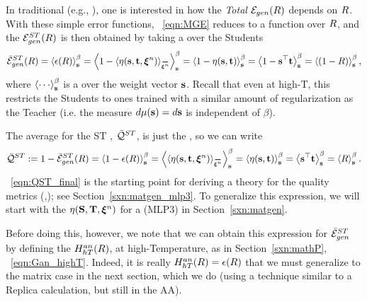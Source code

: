 In traditional \STATMECH (e.g., \cite{SST92}), one is interested in how the \emph{Total 
\GeneralizationError} ${\mathcal{E}}_{gen}(R)$ depends on $R$.
With these simple error functions, \EQN~\ref{eqn:MGE} reduces to a function over $R$,
and the \AverageSTGeneralizationError ${\mathcal{E}}^{ST}_{gen}(R)$ is then obtained by taking a \emph{\ThermalAverage} over the Students 
\begin{align}
\label{eqn:AVGSTGE_R}
\AVGSTGE(\AVGR)=\THRMAVG{\EPSL(\AVGR)}=
\THRMAVG{1-\langle\ETA(\SVEC,\TVEC,\NDXI)\rangle_{\AVGNDXI}}=
\THRMAVG{1-\ETA(\SVEC,\TVEC)}=
\THRMAVG{1-\SVEC^{\top}\TVEC}=
\THRMAVG{(1-\AVGR)}  ,
\end{align}
where $\THRMAVG{\cdots}$ is a \ThermalAverage over the \Student weight vector ${\mathbf{s}}$.
Recall that even at high-T, this restricts the Students to ones trained with a similar
amount of regularization as the Teacher (i.e. the measure  $d\mu({\mathbf{s}})=d{\mathbf{s}}$ is independent 
of $\beta$).

The average \Quality for the ST \Perceptron, $\bar{\mathcal{Q}}^{ST}$,
is just the \AverageGeneralizationAccuracy, so we can write
\begin{align}
\label{eqn:QST_final}
\Q^{ST} := 1 - \AVGSTGE(\AVGR) 
       = \THRMAVG{1 - \EPSL(\AVGR)} 
       = \THRMAVG{\langle\ETA(\SVEC, \TVEC, \NDXI)\rangle_{\AVGNDXI}} 
       = \THRMAVG{\ETA(\SVEC, \TVEC)} 
       = \THRMAVG{\SVEC^{\top}\TVEC} 
       = \THRMAVG{\AVGR}.
\end{align}
\EQN~\ref{eqn:QST_final} is the starting point for deriving a \SEMIEMP theory for the \WW quality metrics (\ALPHA,\ALPHAHAT);
see Section~\ref{sxn:matgen_mlp3}.
To generalize this expression, we will start with the \SelfOverlap $\eta({\mathbf{S}},{\mathbf{T}},\boldsymbol{\xi}^{n})$ for a
\MultiLayerPerceptron (MLP3) in Section~\ref{sxn:matgen}.

Before doing this, however, we note that we can obtain this expression for $\bar{\mathcal{E}}^{ST}_{gen}$ by defining the
\AnnealedHamiltonian $H^{an}_{hT}(R)$, at high-Temperature, as in Section~\ref{sxn:mathP}, \EQN~\ref{eqn:Gan_highT}.
Indeed, it is really $H^{an}_{hT}(R)=\epsilon(R)$ that we must generalize to the matrix case 
in the next section, which we do (using a technique
similar to a Replica calculation, but still in the AA).

